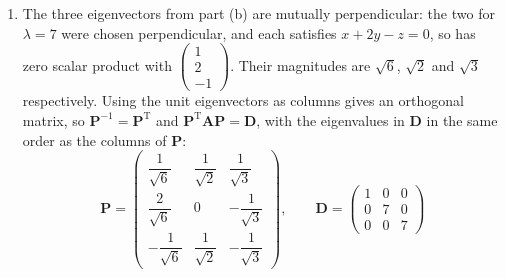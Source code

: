 \documentclass[leqno]{article}
\begin{document}
\begin{enumerate}[
  label=\textbf{\arabic*.},
  leftmargin=*,
  topsep=0pt,
  partopsep=0pt,
  parsep=0pt
]
\begin{djsSolution}
\begin{enumerate}[label=\textbf{(\alph*)}, start=1]
For \(\lambda=7\):
\[
\mathbf{A}-7\mathbf{I}=\begin{pmatrix} -1 & -2 & 1 \\ -2 & -4 & 2 \\ 1 & 2 & -1 \end{pmatrix}
\]

Every row is a multiple of \(x+2y-z\), so the eigenvectors are the non-zero vectors satisfying \(x+2y-z=0\). One such vector is \(\begin{pmatrix}1\\0\\1\end{pmatrix}\), since \(1+0-1=0\).

For a second eigenvector \(\begin{pmatrix}p\\q\\r\end{pmatrix}\) perpendicular to this one, we need
\[
p+2q-r=0,\qquad p+r=0
\]

So \(r=-p\) and \(2p+2q=0\), giving \(q=-p\). Taking \(p=1\), two perpendicular eigenvectors for \(\lambda=7\) are
\[
\begin{pmatrix}1\\0\\1\end{pmatrix},\qquad \begin{pmatrix}1\\-1\\-1\end{pmatrix}
\]

  \item The three eigenvectors from part (b) are mutually perpendicular: the two for \(\lambda=7\) were chosen perpendicular, and each satisfies \(x+2y-z=0\), so has zero scalar product with \(\begin{pmatrix}1\\2\\-1\end{pmatrix}\). Their magnitudes are \(\sqrt{6}\), \(\sqrt{2}\) and \(\sqrt{3}\) respectively. Using the unit eigenvectors as columns gives an orthogonal matrix, so \(\mathbf{P}^{-1}=\mathbf{P}^{\mathrm{T}}\) and \(\mathbf{P}^{\mathrm{T}}\mathbf{A}\mathbf{P}=\mathbf{D}\), with the eigenvalues in \(\mathbf{D}\) in the same order as the columns of \(\mathbf{P}\):
\[
\mathbf{P}=\begin{pmatrix} \dfrac{1}{\sqrt{6}} & \dfrac{1}{\sqrt{2}} & \dfrac{1}{\sqrt{3}} \\[6pt] \dfrac{2}{\sqrt{6}} & 0 & -\dfrac{1}{\sqrt{3}} \\[6pt] -\dfrac{1}{\sqrt{6}} & \dfrac{1}{\sqrt{2}} & -\dfrac{1}{\sqrt{3}} \end{pmatrix},\qquad \mathbf{D}=\begin{pmatrix} 1 & 0 & 0 \\ 0 & 7 & 0 \\ 0 & 0 & 7 \end{pmatrix}
\]


\end{enumerate}
\end{djsSolution}
\end{enumerate}
\end{document}
